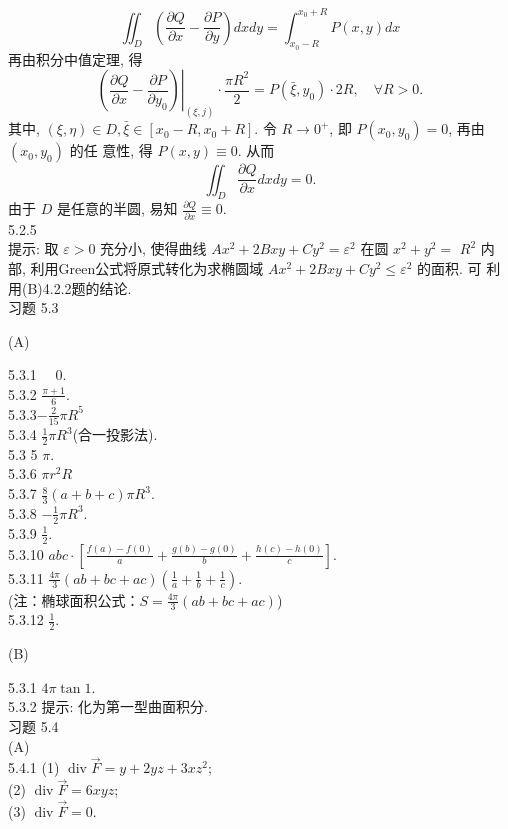 \documentclass[a4paper,11pt,UTF8]{article}
\begin{document}
$$
\iint_D\left(\frac{\partial Q}{\partial x}-\frac{\partial P}{\partial y}\right) d x d y=\int_{x_0-R}^{x_0+R} P(x, y) d x
$$
再由积分中值定理, 得
$$
\left.\left(\frac{\partial Q}{\partial x}-\frac{\partial P}{\partial y_0}\right)\right|_{(\xi, j)} \cdot \frac{\pi R^2}{2}=P\left(\bar{\xi}, y_0\right) \cdot 2 R, \quad \forall R>0 .
$$
其中, $(\xi, \eta) \in D, \bar{\xi} \in\left[x_0-R, x_0+R\right]$. 令 $R \rightarrow 0^{+}$, 即 $P\left(x_0, y_0\right)=0$, 再由 $\left(x_0, y_0\right)$ 的任 意性, 得 $P(x, y) \equiv 0$. 从而
$$
\iint_D \frac{\partial Q}{\partial x} d x d y=0 .
$$
由于 $D$ 是任意的半圆, 易知 $\frac{\partial Q}{\partial x} \equiv 0$.\\
5.2.5 
\\提示: 取 $\varepsilon>0$ 充分小, 使得曲线 $A x^2+2 B x y+C y^2=\varepsilon^2$ 在圆 $x^2+y^2=$ $R^2$ 内部, 利用Green公式将原式转化为求椭圆域 $A x^2+2 B x y+C y^2 \leq \varepsilon^2$ 的面积. 可 利用(B)4.2.2题的结论.\\
习题 5.3\\
\centerline{(A)}
5.3.1 $\quad 0$.\\
5.3.2 $\frac{\pi+1}{6}$.\\
5.3.3$-\frac{2}{15} \pi R^5$\\
5.3.4 $\frac{1}{2} \pi R^3$(合一投影法).\\
5.3 5 $\pi$.\\
5.3.6 $\pi r^2 R$ \\
5.3.7 $\frac{8}{3}(a+b+c) \pi R^3$.\\
5.3.8 $-\frac{1}{2} \pi R^3$.\\
5.3.9 $\frac{1}{2}$.\\
5.3.10 $a b c \cdot\left[\frac{f(a)-f(0)}{a}+\frac{g(b)-g(0)}{b}+\frac{h(c)-h(0)}{c}\right]$.\\
5.3.11 $\frac{4 \pi}{3}\left(ab+bc+ac\right)(\frac{1}{a}+\frac{1}{b}+\frac{1}{c})$.\\
(注：椭球面积公式：$S = \frac{4\pi}{3}(ab+bc+ac)$)\\
5.3.12 $ \frac{1}{2}$.\\
\centerline{(B)}
5.3.1 $4 \pi \tan 1$.\\
5.3.2 提示: 化为第一型曲面积分.\\
习题 5.4\\
(A)\\
5.4.1
(1) $\operatorname{div} \vec{F}=y+2 y z+3 x z^2$;\\
(2) $\operatorname{div} \vec{F}=6 x y z$;\\
(3) $\operatorname{div} \vec{F}=0$.\\
\end{document}

